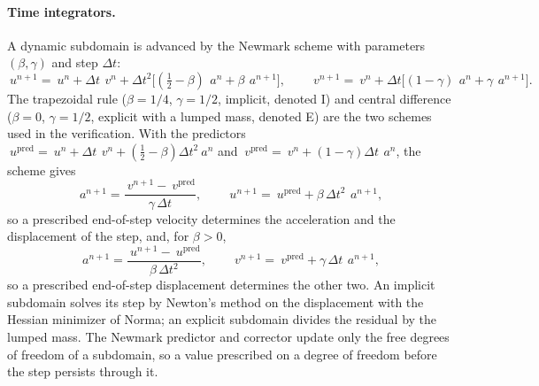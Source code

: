 \documentclass[11pt]{article}
\begin{document}
\paragraph{Time integrators.} A dynamic subdomain is advanced by the
Newmark scheme with parameters $(\beta, \gamma)$ and step $\Delta t$:
\begin{equation}
  ~u^{n+1} = ~u^{n} + \Delta t\, ~v^{n}
    + \Delta t^2 \bigl[(\tfrac12 - \beta)\, ~a^{n} + \beta\, ~a^{n+1}\bigr],
  \qquad
  ~v^{n+1} = ~v^{n} + \Delta t \bigl[(1 - \gamma)\, ~a^{n} + \gamma\, ~a^{n+1}\bigr].
  \label{eq:newmark}
\end{equation}
The trapezoidal rule ($\beta = 1/4$, $\gamma = 1/2$, implicit, denoted I)
and central difference ($\beta = 0$, $\gamma = 1/2$, explicit with a lumped
mass, denoted E) are the two schemes used in the verification. With the
predictors
$~u^{\mathrm{pred}} = ~u^n + \Delta t\, ~v^n + (\tfrac12 - \beta)\Delta t^2 ~a^n$
and $~v^{\mathrm{pred}} = ~v^n + (1-\gamma)\Delta t\, ~a^n$, the scheme gives
\begin{equation}
  ~a^{n+1} = \frac{~v^{n+1} - ~v^{\mathrm{pred}}}{\gamma\, \Delta t},
  \qquad
  ~u^{n+1} = ~u^{\mathrm{pred}} + \beta\, \Delta t^2\, ~a^{n+1},
  \label{eq:newmark-from-v}
\end{equation}
so a prescribed end-of-step velocity determines the acceleration and the
displacement of the step, and, for $\beta > 0$,
\begin{equation}
  ~a^{n+1} = \frac{~u^{n+1} - ~u^{\mathrm{pred}}}{\beta\, \Delta t^2},
  \qquad
  ~v^{n+1} = ~v^{\mathrm{pred}} + \gamma\, \Delta t\, ~a^{n+1},
  \label{eq:newmark-from-u}
\end{equation}
so a prescribed end-of-step displacement determines the other two. An
implicit subdomain solves its step by Newton's method on the displacement
with the Hessian minimizer of Norma; an explicit subdomain divides the
residual by the lumped mass. The Newmark predictor and corrector update
only the free degrees of freedom of a subdomain, so a value prescribed on a
degree of freedom before the step persists through it.
\end{document}
